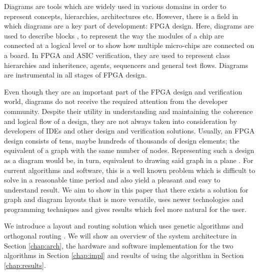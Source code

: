 Diagrams are tools which are widely used in various domains in order to represent
concepts, hierarchies, architectures etc. However, there is a field in 
which diagrams are a key part of development: FPGA design. Here, diagrams are used
to describe blocks \cite{jeon2007verification}, to represent the way the modules of a chip are connected at a 
logical level or to show how multiple micro-chips are connected on a board. In FPGA 
and ASIC verification, they are used to represent class hierarchies and inheritence, 
agents, sequencers and general test flows. Diagrams are instrumental in all
stages of FPGA design.

Even though they are an important part of the FPGA design and verification world, 
diagrams do not receive the required attention from the developer community. Despite 
their utility in understanding and maintaining the coherence and logical flow of a
design, they are not always taken into consideration by developers of IDEs and other 
design and verification solutions. Usually, an FPGA design consists of tens, maybe hundreds 
of thousands of design elements; the equivalent of a graph with the same number of nodes. 
Representing such a design as a diagram would be, in turn, equivalent to drawing said graph 
in a plane \cite{de1990draw}. For current algorithms and software, this is a well known problem which is 
difficult to solve in a reasonable time period and also yield a pleasant and easy to 
understand result. We aim to show in this paper that there exists a solution for graph 
and diagram layouts that is more versatile, uses newer technologies and programming 
techniques and gives results which feel more natural for the user.

We introduce a layout and routing solution which uses genetic algorithms and orthogonal
routing \cite{wybrow2010orthogonal}. We will show an overview of the system architecture in Section \ref{chap:arch}, 
the hardware and software implementation for the two algorithms in Section \ref{chap:impl} 
and results of using the algorithm in Section \ref{chap:results}. 
